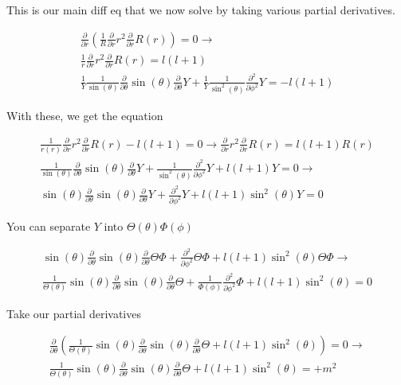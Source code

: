 \documentclass[fleqn]{report}
\newcommand{\del}{\partial}
\newcommand{\equations} [1] {
\begin{gather*}
#1
\end{gather*}
}
\begin{document}
This is our main diff eq that we now solve by taking various partial derivatives.

\equations{
    \frac{\del}{\del r}
    \left(
        \frac{1}{R}
        \frac{\del}{\del r} 
        r^2 
        \frac{\del}{\del r}
        R(r) 
    \right)
    =
    0
    \rightarrow 
    \\
    \frac{1}{r}
    \frac{\del}{\del r} 
    r^2 
    \frac{\del}{\del r}
    R(r) 
    =
    l(l+1)
    \\
    \frac{1}{Y}
    \frac{1}{\sin(\theta)}
    \frac{\del}{\del \theta} 
    \sin(\theta) 
    \frac{\del}{\del \theta} 
    Y
    +
    \frac{1}{Y}
    \frac{1}{\sin^2(\theta)}
    \frac{\del^2}{\del \phi^2}
    Y
    = -l(l+1)
}

With these, we get the equation 
\equations{
    \frac{1}{r(r)}
    \frac{\del}{\del r} 
    r^2 
    \frac{\del}{\del r}
    R(r) 
    -
    l(l+1)
    =
    0
    \rightarrow
    \frac{\del}{\del r} 
    r^2 
    \frac{\del}{\del r}
    R(r) 
    =
    l(l+1) R(r)
    \\
    \frac{1}{\sin(\theta)}
    \frac{\del}{\del \theta} 
    \sin(\theta) 
    \frac{\del}{\del \theta} 
    Y
    +
    \frac{1}{\sin^2(\theta)}
    \frac{\del^2}{\del \phi^2}
    Y
    +
    l(l+1) Y
    =
    0
    \rightarrow 
    \\
    \sin(\theta)
    \frac{\del}{\del \theta} 
    \sin(\theta) 
    \frac{\del}{\del \theta} 
    Y
    +
    \frac{\del^2}{\del \phi^2}
    Y
    +
    l(l+1) \sin^2(\theta) Y
    =
    0
}

You can separate $Y$ into $\Theta(\theta) \Phi(\phi)$

\equations{
    \sin(\theta)
    \frac{\del}{\del \theta} 
    \sin(\theta) 
    \frac{\del}{\del \theta} 
    \Theta \Phi
    +
    \frac{\del^2}{\del \phi^2}
    \Theta \Phi
    +
    l(l+1) \sin^2(\theta)
    \Theta \Phi
    \rightarrow 
    \\
    \frac{1}{\Theta(\theta)}
    \sin(\theta)
    \frac{\del}{\del \theta} 
    \sin(\theta) 
    \frac{\del}{\del \theta} 
    \Theta 
    +
    \frac{1}{\Phi(\phi)}
    \frac{\del^2}{\del \phi^2}
    \Phi
    +
    l(l+1) \sin^2(\theta)
    =
    0
}

Take our partial derivatives

\equations{
    \frac{\del}{\del \theta}
    \left(
    \frac{1}{\Theta(\theta)}
    \sin(\theta)
    \frac{\del}{\del \theta} 
    \sin(\theta) 
    \frac{\del}{\del \theta} 
    \Theta 
    +
    l(l+1) \sin^2(\theta)
    \right)
    =
    0
    \rightarrow
    \\
    \frac{1}{\Theta(\theta)}
    \sin(\theta)
    \frac{\del}{\del \theta} 
    \sin(\theta) 
    \frac{\del}{\del \theta} 
    \Theta 
    +
    l(l+1) \sin^2(\theta)
    =
    +m^2
}
\end{document}
